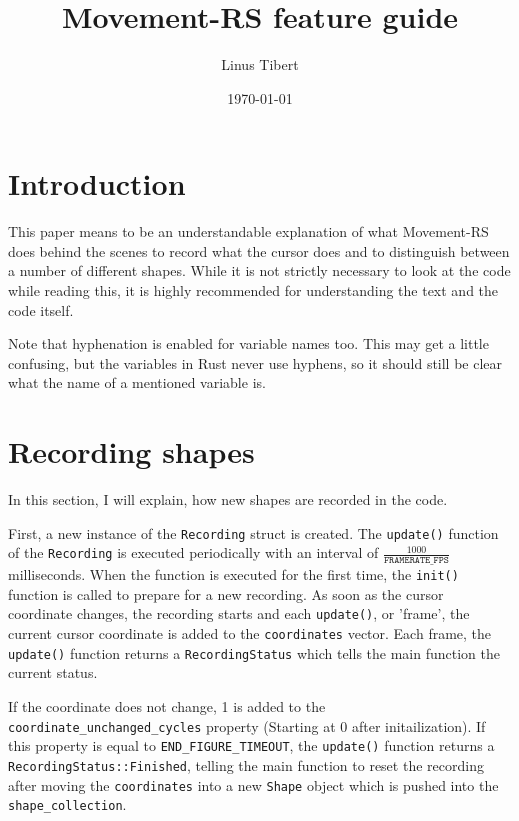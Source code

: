 \documentclass[12pt, a4paper]{article}
\title{Movement-RS feature guide}
\author{Linus Tibert}
\date{\today}
\begin{document}
    \maketitle
    \pagebreak
    \tableofcontents
    \pagebreak

    \section{Introduction}
    This paper means to be an understandable explanation of what Movement-RS does behind the scenes to record what the cursor does and to distinguish between a number of different shapes. While it is not strictly necessary to look at the code while reading this, it is highly recommended for understanding the text and the code itself.

    Note that hyphenation is enabled for variable names too. This may get a little confusing, but the variables in Rust never use hyphens, so it should still be clear what the name of a mentioned variable is.

    \section{Recording shapes}
        \label{sec:recording}
        In this section, I will explain, how new shapes are recorded in the code. 
        
        First, a new instance of the \texttt{Recording} struct is created. The \texttt{update()} function of the \texttt{Recording} is executed periodically with an interval of $\frac{1000}{\texttt{FRAMERATE\_FPS}}$ milliseconds. When the function is executed for the first time, the \texttt{init()} function is called to prepare for a new recording. As soon as the cursor coordinate changes, the recording starts and each \texttt{update()}, or 'frame', the current cursor coordinate is added to the \texttt{coordinates} vector. Each frame, the \texttt{update()} function returns a \texttt{RecordingStatus} which tells the main function the current status.

        If the coordinate does not change, 1 is added to the \texttt{coordinate\_unchanged\_cycles} property (Starting at 0 after initailization). If this property is equal to \texttt{END\_FIGURE\_TIMEOUT}, the \texttt{update()} function returns a \texttt{RecordingStatus::Finished}, telling the main function to reset the recording after moving the \texttt{coordinates} into a new \texttt{Shape} object which is pushed into the \texttt{shape\_collection}.
\end{document}
